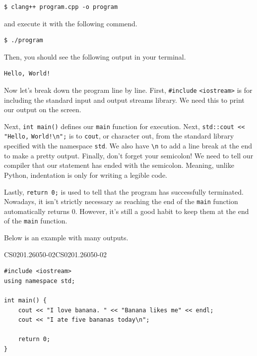 \documentclass[../../../main.tex]{subfiles}
\begin{document}
\begin{basicbox}
\begin{lstlisting}[style=basic]
$ clang++ program.cpp -o program
\end{lstlisting}
\end{basicbox}

and execute it with the following commend.

\begin{basicbox}
\begin{lstlisting}[style=basic]
$ ./program
\end{lstlisting}
\end{basicbox}

Then, you should see the following output in your terminal.

\begin{outputbox}
\begin{lstlisting}[style=basic]
Hello, World!
\end{lstlisting}
\end{outputbox}

Now let's break down the program line by line. First, \verb|#include|
\newline \verb|<iostream>| is for including the standard input and
output streams library. We need this to print our output on the
screen.

Next, \verb|int main()| defines our \verb|main| function for
execution. Next, \verb|std::cout << "Hello,| \verb|World!\n";| is to
\verb|cout|, or character out, from the standard library specified
with the namespace \verb|std|. We also have \verb|\n| to add a line
break at the end to make a pretty output. Finally, don't forget your
semicolon! We need to tell our compiler that our statement has ended
with the semicolon. Meaning, unlike Python, indentation is only for
writing a legible code.

Lastly, \verb|return 0;| is used to tell that the program has
successfully terminated. Nowadays, it isn't strictly necessary as
reaching the end of the \verb|main| function automatically returns
$0$. However, it's still a good habit to keep them at the end of the
\verb|main| function.

Below is an example with many outputs.

\begin{cppbox}{CS0201.26050-02}{CS0201.26050-02}
\begin{lstlisting}[style=cppstyle]
#include <iostream>
using namespace std;

int main() {
    cout << "I love banana. " << "Banana likes me" << endl;
    cout << "I ate five bananas today\n";

    return 0;
}
\end{lstlisting}
\end{cppbox}
\end{document}
